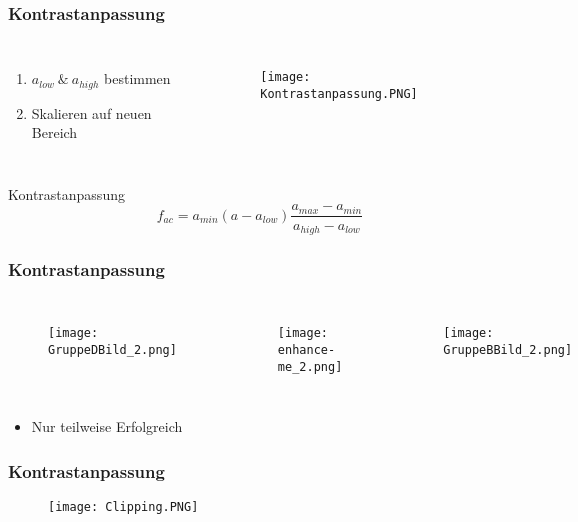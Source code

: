 \documentclass[14pt]{beamer}
\begin{document}
\begin{frame}
	\frametitle{Kontrastanpassung}	
	\begin{columns}
		\begin{enumerate}
			\item $a_{low}\ \&\ a_{high}$ bestimmen
			\item Skalieren auf neuen Bereich 
		\end{enumerate}	
		\begin{figure}
			\centering
			\texttt{[image: Kontrastanpassung.PNG]}
		\end{figure}
	\end{columns}

	\begin{block}{Kontrastanpassung}
		\begin{equation*}
		f_{ac}=a_{min} (a - a_{low}) \frac{a_{max}-a_{min}}{a_{high}-a_{low}}
		\end{equation*}
	\end{block}		
		
	\end{frame}

\begin{frame}
	\frametitle{Kontrastanpassung}
	\begin{columns}[c]
		\column{.3\textwidth}
		\begin{figure}
			\texttt{[image: GruppeDBild\_2.png]}
		\end{figure}
		\column{.3\textwidth}
		\begin{figure}
			\texttt{[image: enhance-me\_2.png]}
		\end{figure}
		\column{.3\textwidth}
		\begin{figure}
			\texttt{[image: GruppeBBild\_2.png]}
		\end{figure}		 	
	\end{columns}	
	\begin{itemize}
		\item Nur teilweise Erfolgreich
	\end{itemize}
\end{frame}

\begin{frame}
	\frametitle{Kontrastanpassung}
	\begin{figure}
		\centering
		\texttt{[image: Clipping.PNG]}
	\end{figure}
\end{frame}
\end{document}
